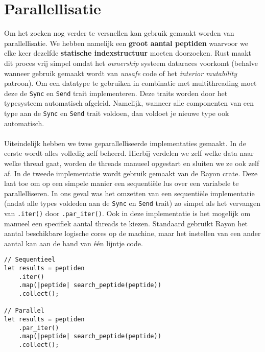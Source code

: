 \section{Parallellisatie}\label{sec:parallellisatie}
Om het zoeken nog verder te versnellen kan gebruik gemaakt worden van parallellisatie.
We hebben namelijk een \textbf{groot aantal peptiden} waarvoor we elke keer dezelfde \textbf{statische indexstructuur} moeten doorzoeken.
Rust maakt dit proces vrij simpel omdat het \textit{ownership} systeem dataraces voorkomt (behalve wanneer gebruik gemaakt wordt van \textit{unsafe} code of het \textit{interior mutability} patroon)\cite{rust_data_races}.
Om een datatype te gebruiken in combinatie met multithreading moet deze de \texttt{Sync} en \texttt{Send} trait implementeren.
Deze traits worden door het typesysteem automatisch afgeleid.
Namelijk, wanneer alle componenten van een type aan de \texttt{Sync} en \texttt{Send} trait voldoen, dan voldoet je nieuwe type ook automatisch.
\\ \\
Uiteindelijk hebben we twee geparallelliseerde implementaties gemaakt.
In de eerste wordt alles volledig zelf beheerd.
Hierbij verdelen we zelf welke data naar welke thread gaat, worden de threads manueel opgestart en sluiten we ze ook zelf af.
In de tweede implementatie wordt gebruik gemaakt van de Rayon crate\cite{rayon}.
Deze laat toe om op een simpele manier een sequentiële lus over een variabele te parallelliseren.
In ons geval was het omzetten van een sequentiële implementatie (nadat alle types voldeden aan de \texttt{Sync} en \texttt{Send} trait) zo simpel als het vervangen van \texttt{.iter()} door \texttt{.par\_iter()}.
Ook in deze implementatie is het mogelijk om manueel een specifiek aantal threads te kiezen.
Standaard gebruikt Rayon het aantal beschikbare logische cores op de machine, maar het instellen van een ander aantal kan aan de hand van één lijntje code.

\begin{verbatim}
// Sequentieel
let results = peptiden
    .iter()
    .map(|peptide| search_peptide(peptide))
    .collect();

// Parallel
let results = peptiden
    .par_iter()
    .map(|peptide| search_peptide(peptide))
    .collect();
\end{verbatim}

